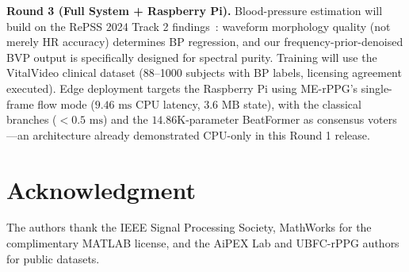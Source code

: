 \documentclass[conference]{IEEEtran}
\begin{document}
\textbf{Round 3 (Full System + Raspberry Pi).} Blood-pressure estimation
will build on the RePSS 2024 Track 2 findings~\cite{sun2024repss}: waveform
morphology quality (not merely HR accuracy) determines BP regression, and
our frequency-prior-denoised BVP output is specifically designed for
spectral purity. Training will use the VitalVideo clinical dataset
(88--1000 subjects with BP labels, licensing agreement executed). Edge
deployment targets the Raspberry Pi using ME-rPPG's single-frame flow mode
($9.46\text{ ms}$ CPU latency, $3.6\text{ MB}$ state), with the classical
branches ($<0.5\text{ ms}$) and the $14.86$K-parameter BeatFormer as
consensus voters---an architecture already demonstrated CPU-only in this
Round 1 release.

\section*{Acknowledgment}
The authors thank the IEEE Signal Processing Society, MathWorks for the
complimentary MATLAB license, and the AiPEX Lab and UBFC-rPPG authors for
public datasets.



\end{document}
